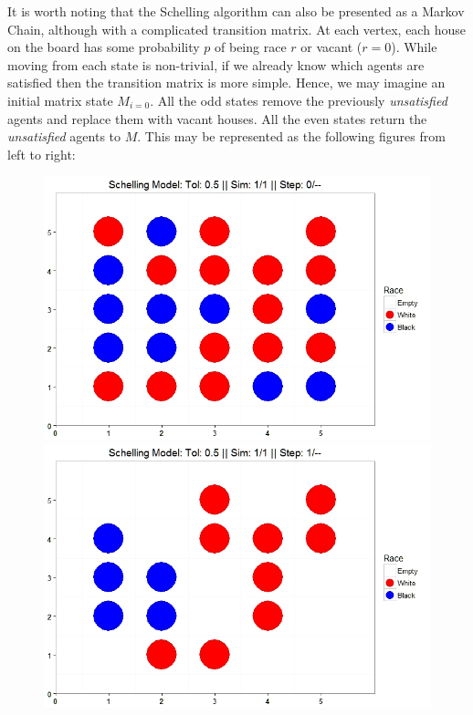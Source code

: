 \documentclass[11pt]{asaproc}
\newcommand{\1}{\mathbb{1}}
\begin{document}
It is worth noting that the Schelling algorithm can also be presented as a Markov Chain, although with a complicated transition matrix. At each vertex, each house on the board has some probability $p$ of being race $r$ or vacant ($r=0$). While moving from each state is non-trivial, if we already know which agents are satisfied then the transition matrix is more simple. Hence, we may imagine an initial matrix state $M_{i=0}$. All the odd states remove the previously \textit{unsatisfied} agents and replace them with vacant houses. All the even states return the \textit{unsatisfied} agents to $M$. This may be represented as the following figures from left to right:

\begin{figure}[h!]
\centering

{%
\includegraphics[scale=0.23]{figures/EX0.jpeg}
}
{%
\includegraphics[scale=0.23]{figures/Ex1.jpeg}
}
\end{figure}
\end{document}
